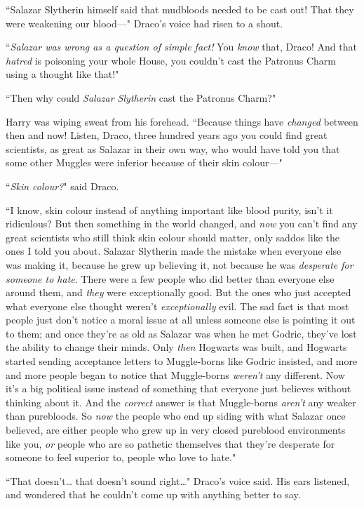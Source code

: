 ``Salazar Slytherin himself said that mudbloods needed to be cast out! That they were weakening our blood—" Draco's voice had risen to a shout.

``\emph{Salazar was wrong as a question of simple fact!} You \emph{know} that, Draco! And that \emph{hatred} is poisoning your whole House, you couldn't cast the Patronus Charm using a thought like that!"

``Then why could \emph{Salazar Slytherin} cast the Patronus Charm?"

Harry was wiping sweat from his forehead. ``Because things have \emph{changed} between then and now! Listen, Draco, three hundred years ago you could find great scientists, as great as Salazar in their own way, who would have told you that some other Muggles were inferior because of their skin colour—"

``\emph{Skin colour?}" said Draco.

``I know, skin colour instead of anything important like blood purity, isn't it ridiculous? But then something in the world changed, and \emph{now} you can't find any great scientists who still think skin colour should matter, only saddos like the ones I told you about. Salazar Slytherin made the mistake when everyone else was making it, because he grew up believing it, not because he was \emph{desperate for someone to hate}. There were a few people who did better than everyone else around them, and \emph{they} were exceptionally good. But the ones who just accepted what everyone else thought weren't \emph{exceptionally} evil. The sad fact is that most people just don't notice a moral issue at all unless someone else is pointing it out to them; and once they're as old as Salazar was when he met Godric, they've lost the ability to change their minds. Only \emph{then} Hogwarts was built, and Hogwarts started sending acceptance letters to Muggle-borns like Godric insisted, and more and more people began to notice that Muggle-borns \emph{weren't} any different. Now it's a big political issue instead of something that everyone just believes without thinking about it. And the \emph{correct} answer is that Muggle-borns \emph{aren't} any weaker than purebloods. So \emph{now} the people who end up siding with what Salazar once believed, are either people who grew up in very closed pureblood environments like you, \emph{or} people who are so pathetic themselves that they're desperate for someone to feel superior to, people who love to hate."

``That doesn't{\ldots} that doesn't sound right{\ldots}" Draco's voice said. His ears listened, and wondered that he couldn't come up with anything better to say.

